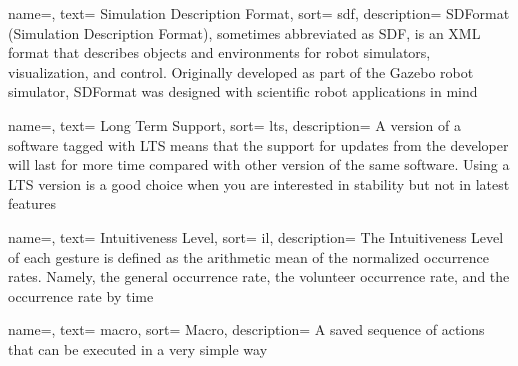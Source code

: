 {
  name=,
  text= Simulation Description Format,
  sort= sdf,
  description= {SDFormat (Simulation Description Format), sometimes abbreviated as SDF, is an XML format that describes objects and environments for robot simulators, visualization, and control. Originally developed as part of the Gazebo robot simulator, SDFormat was designed with scientific robot applications in mind}
}


{
  name=,
  text= Long Term Support,
  sort= lts,
  description= {A version of a software tagged with LTS means that the support for updates from the developer will last for more time compared with other version of the same software. Using a LTS version is a good choice when you are interested in stability but not in latest features}
}

{
  name=,
  text= Intuitiveness Level,
  sort= il,
  description= {The Intuitiveness Level of each gesture is defined as the arithmetic mean of the normalized occurrence rates. Namely, the general occurrence rate, the volunteer occurrence rate, and the occurrence rate by time}
}

{
  name=,
  text= macro,
  sort= Macro,
  description= {A saved sequence of actions that can be executed in a very simple way}
}





